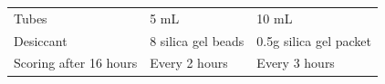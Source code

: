 \documentclass[]{article}
\begin{document}
\begin{longtable}[]{@{}lll@{}}
\begin{minipage}[t]{0.24\columnwidth}
Tubes\strut
\end{minipage} & \begin{minipage}[t]{0.33\columnwidth}\raggedright\strut
5 mL\strut
\end{minipage} & \begin{minipage}[t]{0.34\columnwidth}\raggedright\strut
10 mL\strut
\end{minipage}\tabularnewline
\begin{minipage}[t]{0.24\columnwidth}\raggedright\strut
Desiccant\strut
\end{minipage} & \begin{minipage}[t]{0.33\columnwidth}\raggedright\strut
8 silica gel beads\strut
\end{minipage} & \begin{minipage}[t]{0.34\columnwidth}\raggedright\strut
0.5g silica gel packet\strut
\end{minipage}\tabularnewline
\begin{minipage}[t]{0.24\columnwidth}\raggedright\strut
Scoring after 16 hours\strut
\end{minipage} & \begin{minipage}[t]{0.33\columnwidth}\raggedright\strut
Every 2 hours\strut
\end{minipage} & \begin{minipage}[t]{0.34\columnwidth}\raggedright\strut
Every 3 hours\strut
\end{minipage}\tabularnewline
\bottomrule
\end{longtable}

\newpage
\end{document}
